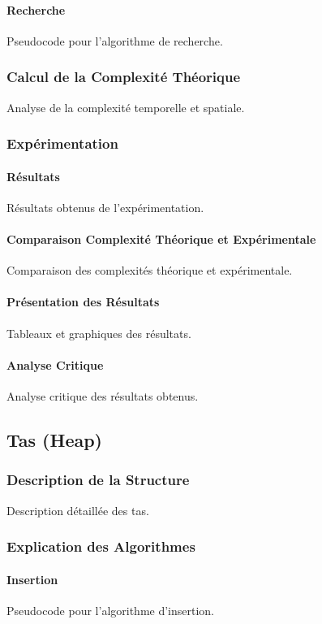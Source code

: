 \documentclass[a4paper, 12pt]{article}
\begin{document}
\paragraph{Recherche}
Pseudocode pour l'algorithme de recherche.

\subsubsection{Calcul de la Complexité Théorique}
Analyse de la complexité temporelle et spatiale.

\subsubsection{Expérimentation}
\paragraph{Résultats}
Résultats obtenus de l'expérimentation.

\paragraph{Comparaison Complexité Théorique et Expérimentale}
Comparaison des complexités théorique et expérimentale.

\paragraph{Présentation des Résultats}
Tableaux et graphiques des résultats.

\paragraph{Analyse Critique}
Analyse critique des résultats obtenus.

\subsection{Tas (Heap)}
\subsubsection{Description de la Structure}
Description détaillée des tas.

\subsubsection{Explication des Algorithmes}
\paragraph{Insertion}
Pseudocode pour l'algorithme d'insertion.
\end{document}
